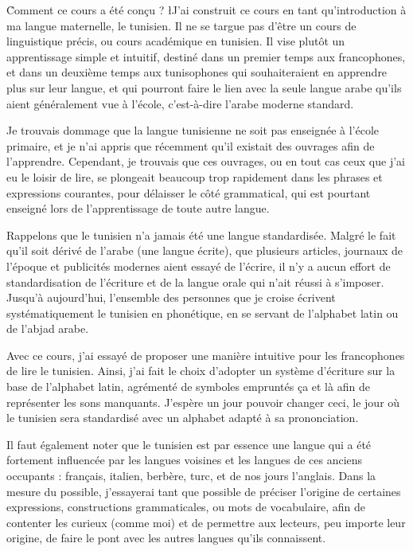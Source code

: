 \h*{Comment ce cours a été conçu ?}
\l{J}'ai construit ce cours en tant qu'introduction à ma langue maternelle, le tunisien. Il ne se targue pas d'être un cours de linguistique précis, ou cours académique en tunisien. Il vise plutôt un apprentissage simple et intuitif, destiné dans un premier temps aux francophones, et dans un deuxième temps aux tunisophones qui souhaiteraient en apprendre plus sur leur langue, et qui pourront faire le lien avec la seule langue arabe qu'ils aient généralement vue à l'école, c'est-à-dire l'arabe moderne standard. 

Je trouvais dommage que la langue tunisienne ne soit pas enseignée à l'école primaire, et je n'ai appris que récemment qu'il existait des ouvrages afin de l'apprendre. Cependant, je trouvais que ces ouvrages, ou en tout cas ceux que j'ai eu le loisir de lire, se plongeait beaucoup trop rapidement dans les phrases et expressions courantes, pour délaisser le côté grammatical, qui est pourtant enseigné lors de l'apprentissage de toute autre langue.

Rappelons que le tunisien n'a jamais été une langue standardisée. Malgré le fait qu'il soit dérivé de l'arabe (une langue écrite), que plusieurs articles, journaux de l'époque et publicités modernes aient essayé de l'écrire, il n'y a aucun effort de standardisation de l'écriture et de la langue orale qui n'ait réussi à s'imposer. Jusqu'à aujourd'hui, l'ensemble des personnes que je croise écrivent systématiquement le tunisien en phonétique, en se servant de l'alphabet latin ou de l'abjad arabe.

Avec ce cours, j'ai essayé de proposer une manière intuitive pour les francophones de lire le tunisien. Ainsi, j'ai fait le choix d'adopter un système d'écriture sur la base de l'alphabet latin, agrémenté de symboles empruntés ça et là afin de représenter les sons manquants. J'espère un jour pouvoir changer ceci, le jour où le tunisien sera standardisé avec un alphabet adapté à sa prononciation. 

Il faut également noter que le tunisien est par essence une langue qui a été fortement influencée par les langues voisines et les langues de ces anciens occupants : français, italien, berbère, turc, et de nos jours l'anglais. Dans la mesure du possible, j'essayerai tant que possible de préciser l'origine de certaines expressions, constructions grammaticales, ou mots de vocabulaire, afin de contenter les curieux (comme moi) et de permettre aux lecteurs, peu importe leur origine, de faire le pont avec les autres langues qu'ils connaissent.